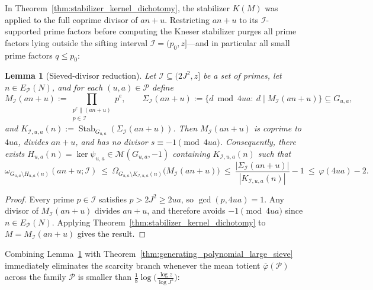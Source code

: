 \documentclass[11pt, a4paper]{article}
\theoremstyle{plain}
\newtheorem{lemma}[theorem]{Lemma}
\theoremstyle{definition}
\begin{document}
In Theorem~\ref{thm:stabilizer_kernel_dichotomy}, the stabilizer $K(M)$ was applied to the full coprime divisor of $an+u$. Restricting $an+u$ to its $\mathcal{I}$-supported prime factors before computing the Kneser stabilizer purges all prime factors lying outside the sifting interval $\mathcal{I}=(p_0,z]$—and in particular all small prime factors $q\le p_0$:

\begin{lemma}[Sieved-divisor reduction]\label{lem:sieved_divisor_reduction}
Let $\mathcal{I}\subseteq(2J^{2},z]$ be a set of primes, let $n\in E_{\mathcal{P}}(N)$, and for each $(u,a)\in\mathcal{P}$ define
$$M_{\mathcal{I}}(an+u):=\prod_{\substack{p^{e}\parallel(an+u)\\ p\in\mathcal{I}}}p^{e},\qquad\Sigma_{\mathcal{I}}(an+u):=\big\{d\bmod 4ua:\ d\mid M_{\mathcal{I}}(an+u)\big\}\subseteq G_{u,a},$$
and $K_{\mathcal{I},u,a}(n):=\operatorname{Stab}_{G_{u,a}}(\Sigma_{\mathcal{I}}(an+u))$. Then $M_{\mathcal{I}}(an+u)$ is coprime to $4ua$, divides $an+u$, and has no divisor $s\equiv-1\pmod{4ua}$. Consequently, there exists $H_{u,a}(n)=\ker\psi_{u,a}\in\mathcal{M}(G_{u,a},-1)$ containing $K_{\mathcal{I},u,a}(n)$ such that
$$\omega_{G_{u,a}\setminus H_{u,a}(n)}(an+u;\mathcal{I})\ \le\ \Omega_{G_{u,a}\setminus K_{\mathcal{I},u,a}(n)}\big(M_{\mathcal{I}}(an+u)\big)\ \le\ \frac{|\Sigma_{\mathcal{I}}(an+u)|}{|K_{\mathcal{I},u,a}(n)|}-1\ \le\ \varphi(4ua)-2.$$
\end{lemma}
\begin{proof}
Every prime $p\in\mathcal{I}$ satisfies $p>2J^{2}\ge 2ua$, so $\gcd(p,4ua)=1$. Any divisor of $M_{\mathcal{I}}(an+u)$ divides $an+u$, and therefore avoids $-1\pmod{4ua}$ since $n\in E_{\mathcal{P}}(N)$. Applying Theorem~\ref{thm:stabilizer_kernel_dichotomy} to $M=M_{\mathcal{I}}(an+u)$ gives the result.
\end{proof}

Combining Lemma~\ref{lem:sieved_divisor_reduction} with Theorem~\ref{thm:generating_polynomial_large_sieve} immediately eliminates the scarcity branch whenever the mean totient $\overline{\varphi}(\mathcal{P})$ across the family $\mathcal{P}$ is smaller than $\frac18\log\big(\frac{\log z}{\log J^5}\big)$:
\end{document}
